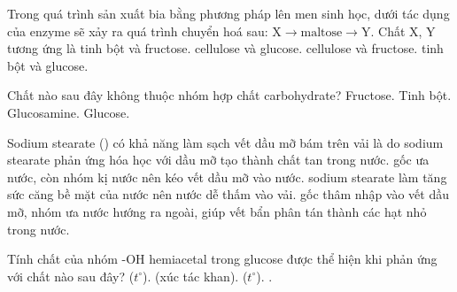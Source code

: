 \documentclass[11pt,a4paper]{article}
\begin{document}
\begin{ex}
Trong quá trình sản xuất bia bằng phương pháp lên men sinh học, dưới tác dụng của enzyme sẽ xảy ra quá trình chuyển hoá sau: $\text{X} \longrightarrow \text{maltose} \longrightarrow \text{Y}$. Chất X, Y tương ứng là
\choice
{tinh bột và fructose.}
{cellulose và glucose.}
{cellulose và fructose.}
{\True tinh bột và glucose.}
\end{ex}

\begin{ex}
Chất nào sau đây không thuộc nhóm hợp chất carbohydrate?
\choice
{Fructose.}
{Tinh bột.}
{\True Glucosamine.}
{Glucose.}
\end{ex}

\begin{ex}
Sodium stearate () có khả năng làm sạch vết dầu mỡ bám trên vải là do
\choice
{sodium stearate phản ứng hóa học với dầu mỡ tạo thành chất tan trong nước.}
{gốc  ưa nước, còn nhóm  kị nước nên kéo vết dầu mỡ vào nước.}
{sodium stearate làm tăng sức căng bề mặt của nước nên nước dễ thấm vào vải.}
{\True gốc  thâm nhập vào vết dầu mỡ, nhóm  ưa nước hướng ra ngoài, giúp vết bẩn phân tán thành các hạt nhỏ trong nước.}
\end{ex}

\begin{ex}
Tính chất của nhóm -OH hemiacetal trong glucose được thể hiện khi phản ứng với chất nào sau đây?
\choice
{ ($t^\circ$).}
{\True {} (xúc tác  khan).}
{ ($t^\circ$).}
{.}
\end{ex}
\end{document}
